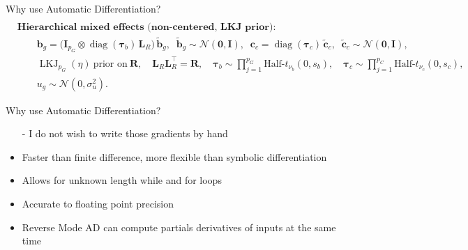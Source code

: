 \documentclass[dvipsnames]{beamer}
\begin{document}
\begin{frame}{Why use Automatic Differentiation?}
\begin{align*}
\\[6pt]
&\textbf{Hierarchical mixed effects (non-centered, LKJ prior):}
\\[-2pt]
&\qquad
\mathbf b_{g}=\big(\mathbf I_{p_G}\otimes\operatorname{diag}(\boldsymbol\tau_b)\,\mathbf L_R\big)\,\tilde{\mathbf b}_{g},
\;\;
\tilde{\mathbf b}_{g}\sim\mathcal N(\mathbf 0,\mathbf I),
\;\;
\mathbf c_{c}=\operatorname{diag}(\boldsymbol\tau_c)\,\tilde{\mathbf c}_{c},
\;\;
\tilde{\mathbf c}_{c}\sim\mathcal N(\mathbf 0,\mathbf I),
\\[-2pt]
&\qquad
\operatorname{LKJ}_{p_G}(\eta)\ \text{prior on}\ \mathbf R,\quad
\mathbf L_R\mathbf L_R^{\!\top}=\mathbf R,
\quad
\boldsymbol\tau_b\sim\prod_{j=1}^{p_G}\text{Half-}t_{\nu_b}(0,s_b),
\quad
\boldsymbol\tau_c\sim\prod_{j=1}^{p_C}\text{Half-}t_{\nu_c}(0,s_c),
\\[-2pt]
&\qquad
u_g\sim\mathcal N(0,\sigma_u^2).
\end{align*}
\end{frame}

\begin{frame}{Why use Automatic Differentiation?}
\begin{itemize}
\item[-] I do not wish to write those gradients by hand 
\pause
\item Faster than finite difference, more flexible than symbolic differentiation
\pause
\item Allows for unknown length while and for loops
\pause
\item Accurate to floating point precision
\pause
\item Reverse Mode AD can compute partials derivatives of inputs at the same time
\end{itemize}
\end{frame}

\end{document}
